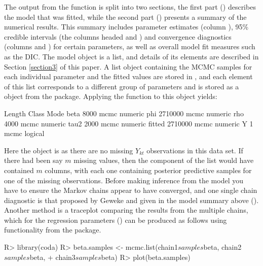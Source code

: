 \documentclass[article, nojss]{jss}
\begin{document}
The output from the  function is split into two sections, the first part () describes the model that was fitted, while the second part () presents  a summary of the numerical results. This summary includes parameter estimates (column ), 95\% credible intervals (the columns headed  and ) and convergence diagnostics (columns  and ) for certain parameters, as well as overall model fit measures such as the DIC. The model object  is a list, and details of its elements are described in Section \ref{section3} of this paper. A list object containing the MCMC samples for each individual parameter and the fitted values are stored in , and each element of this list corresponds to a different group of parameters and is stored as a   object from the  package.  Applying the  function to this object yields:







\begin{CodeOutput}
       Length  Class Mode   
beta      8000 mcmc  numeric
phi    2710000 mcmc  numeric
rho       4000 mcmc  numeric
tau2      2000 mcmc  numeric
fitted 2710000 mcmc  numeric
Y            1 mcmc  logical
\end{CodeOutput}



Here the  object is  as there are no missing $Y_{kt}$ observations in this data set. If there had been say $m$ missing values, then the  component of the list would have contained $m$ columns, with each one containing posterior predictive samples for one of the missing observations. Before making inference from the model you have to ensure the Markov chains appear to have converged, and one single chain diagnostic is that proposed by Geweke and given in the model summary above (). Another method is a traceplot comparing the results from the multiple chains, which for the regression parameters () can be produced as follows using functionality from the  package.

\begin{CodeInput}
R>  library(coda)
R>  beta.samples <- mcmc.list(chain1$samples$beta, chain2$samples$beta, 
+           chain3$samples$beta)
R>  plot(beta.samples)
\end{CodeInput}
\end{document}
